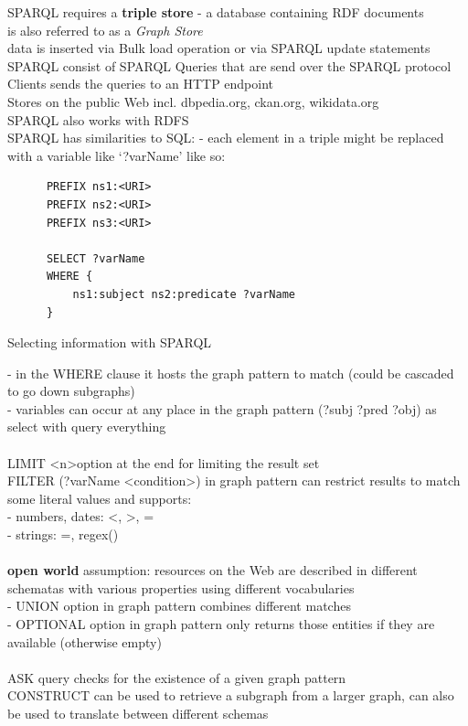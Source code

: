 SPARQL requires a \textbf{triple store} - a database containing RDF documents \\
is also referred to as a \textit{Graph Store} \\
data is inserted via Bulk load operation or via SPARQL update statements \\
SPARQL consist of SPARQL Queries that are send over the SPARQL protocol \\
Clients sends the queries to an HTTP endpoint \\
Stores on the public Web incl. dbpedia.org, ckan.org, wikidata.org \\
SPARQL also works with RDFS \\
SPARQL has similarities to SQL:
- each element in a triple might be replaced with a variable like `?varName' like so: \\

\begin{listing}[H]
	\begin{verbatim}
	  PREFIX ns1:<URI>
	  PREFIX ns2:<URI>
	  PREFIX ns3:<URI>

	  SELECT ?varName
	  WHERE {
	      ns1:subject ns2:predicate ?varName
	  }
	\end{verbatim}
\caption{Selecting information with \gls{SPARQL}}
\label{lst:select_sparql}
\end{listing}

- in the WHERE clause it hosts the graph pattern to match (could be cascaded to go down subgraphs) \\
- variables can occur at any place in the graph pattern (?subj ?pred ?obj) as select with query everything \\
\\
LIMIT \textless n\textgreater option at the end for limiting the result set \\
FILTER (?varName \textless condition\textgreater ) in graph pattern can restrict results to match some
literal values and supports: \\
- numbers, dates: \textless, \textgreater, = \\
- strings: =, regex() \\
\\
\textbf{open world} assumption: resources on the Web are described in different schematas with various properties
using different vocabularies \\
- UNION option in graph pattern combines different matches \\
- OPTIONAL option in graph pattern only returns those entities if they are available (otherwise empty) \\
\\
ASK query checks for the existence of a given graph pattern \\
CONSTRUCT can be used to retrieve a subgraph from a larger graph, can also be used to translate between different schemas \\

